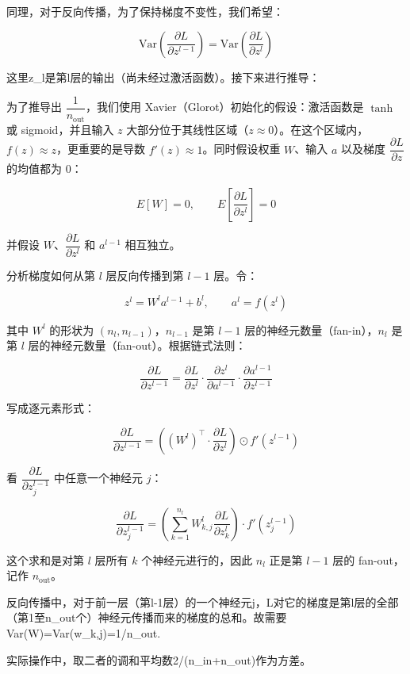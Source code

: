 同理，对于反向传播，为了保持梯度不变性，我们希望：

\[
\mathrm{Var}\left(\frac{\partial L}{\partial z^{l-1}}\right)
=\mathrm{Var}\left(\frac{\partial L}{\partial z^l}\right)
\]

这里z\_l是第l层的输出（尚未经过激活函数）。接下来进行推导：

为了推导出 \(\dfrac{1}{n_{\mathrm{out}}}\)，我们使用 Xavier（Glorot）初始化的假设：激活函数是 \(\tanh\) 或 sigmoid，并且输入 \(z\) 大部分位于其线性区域（\(z\approx 0\)）。在这个区域内，\(f(z)\approx z\)，更重要的是导数 \(f'(z)\approx 1\)。同时假设权重 \(W\)、输入 \(a\) 以及梯度 \(\dfrac{\partial L}{\partial z}\) 的均值都为 0：

\[
E[W]=0,\qquad E\left[\frac{\partial L}{\partial z^l}\right]=0
\]

并假设 \(W\)、\(\dfrac{\partial L}{\partial z^l}\) 和 \(a^{l-1}\) 相互独立。

分析梯度如何从第 \(l\) 层反向传播到第 \(l-1\) 层。令：

\[
z^l=W^la^{l-1}+b^l,\qquad a^l=f(z^l)
\]

其中 \(W^l\) 的形状为 \((n_l,n_{l-1})\)，\(n_{l-1}\) 是第 \(l-1\) 层的神经元数量（fan-in），\(n_l\) 是第 \(l\) 层的神经元数量（fan-out）。根据链式法则：

\[
\frac{\partial L}{\partial z^{l-1}}
=\frac{\partial L}{\partial z^l}\cdot
\frac{\partial z^l}{\partial a^{l-1}}\cdot
\frac{\partial a^{l-1}}{\partial z^{l-1}}
\]

写成逐元素形式：

\[
\frac{\partial L}{\partial z^{l-1}}
=\left((W^l)^\top\cdot\frac{\partial L}{\partial z^l}\right)
\odot f'(z^{l-1})
\]

看 \(\dfrac{\partial L}{\partial z_j^{l-1}}\) 中任意一个神经元 \(j\)：

\[
\frac{\partial L}{\partial z_j^{l-1}}
=\left(\sum_{k=1}^{n_l}W^l_{k,j}\frac{\partial L}{\partial z_k^l}\right)\cdot f'(z_j^{l-1})
\]

这个求和是对第 \(l\) 层所有 \(k\) 个神经元进行的，因此 \(n_l\) 正是第 \(l-1\) 层的 fan-out，记作 \(n_{\mathrm{out}}\)。

反向传播中，对于前一层（第l-1层）的一个神经元j，L对它的梯度是第l层的全部（第1至n\_out个）神经元传播而来的梯度的总和。故需要Var(W)=Var(w\_k,j)=1/n\_out.

实际操作中，取二者的调和平均数2/(n\_in+n\_out)作为方差。

